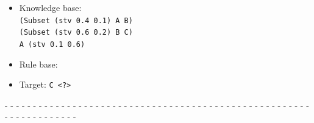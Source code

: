 \documentclass[aspectratio=169]{beamer}
\begin{document}
\begin{frame}

  {\small
    \begin{itemize}
    \item Knowledge base:\\
      \texttt{(Subset (stv 0.4 0.1) A B)}\\
      \texttt{(Subset (stv 0.6 0.2) B C)}\\
      \texttt{A (stv 0.1 0.6)}

    \item Rule base:\\
      \begin{prooftree}
      \end{prooftree}

      \begin{prooftree}
      \end{prooftree}
        
    \item Target: \texttt{C <?>}

    \end{itemize}
  }

  - - - - - - - - - - - - - - - - - - - - - - - - - - - - - - - - - -
  - - - - - - - - - - - - - - - - - - - - - - - - - - - - - - - - -\\[0.1cm]

\end{frame}
\end{document}

